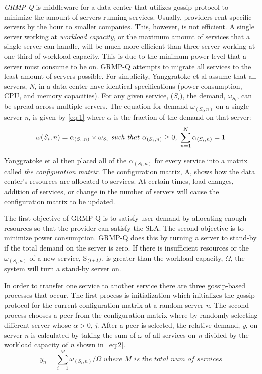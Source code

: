 \documentclass{sig-alternate}
\begin{document}
\emph{GRMP-Q} is middleware for a data center that utilizes gossip protocol to minimize the amount of servers running services. Usually, providers rent specific servers by the hour to smaller companies. This, however, is not efficient. A single server working at  \emph{workload capacity}, or the maximum amount of services that a single server can handle, will be much more efficient than three server working at one third of workload capacity. This is due to the minimum power level that a server must consume to be on. GRMP-Q attempts to migrate all services to the least amount of servers possible.  For simplicity, Yanggratoke et al assume that all servers, \emph{N}, in a data center have identical specifications (power consumption, CPU, and memory capacities). For any given service, ($S_i$), the demand, \emph{$\omega_{S_i}$}, can be spread across multiple servers. The equation for demand $\omega_{(S_i,n)}$ on a single server \emph{n}, is given by \eqref{eq:1} where $\alpha$ is the fraction of the demand on that server:
\begin{equation}
\omega(S_{i},n) = \alpha_{(S_{i},n)} \times \omega_{S_i} \text{\emph{~such that~}} \alpha_{(S_{i},n)} \geq 0,~ \sum_{n=1}^{N} \alpha_{(S_{i},n)} = 1 \label{eq:1}
\end{equation}

Yanggratoke et al then placed all of the \emph{$\alpha_{(S_{i},n)}$} for every service into a matrix called \emph{the configuration matrix}. The configuration matrix, A, shows how the data center's resources are allocated to services. At certain times, load changes, addition of services, or change in the number of servers will cause the configuration matrix to be updated. 

The first objective of GRMP-Q is to satisfy user demand by allocating enough resources so that the provider can satisfy the SLA. The second objective is to minimize power consumption. GRMP-Q does this by turning a server to stand-by if the total demand on the server is zero. If there is insufficient resources or the \emph{$\omega_{(S_{i},n)}$} of a new service, S$_{\text{\emph{(i+1)}}}$, is greater than the workload capacity, $\Omega$, the system will turn a stand-by server on. 

In order to transfer one service to another service there are three gossip-based processes that occur. The first process is initialization which initializes the gossip protocol for the current configuration matrix at a random server \emph{n}.  The second process chooses a peer from the configuration matrix where by randomly selecting different server whose $\alpha > 0$, \emph{j}. After a peer is selected, the relative demand, \emph{y}, on server \emph{n} is calculated by taking the sum of \emph{$\omega$} of all services on \emph{n} divided by the workload capacity of \emph{n} shown in~\eqref{eq:2}.
\begin{equation}
y_n = \sum_{i=1}^M \omega_{(S_i,n)}/\Omega \textit{~where M is the total num of services}\label{eq:2}
\end{equation}
\end{document}
